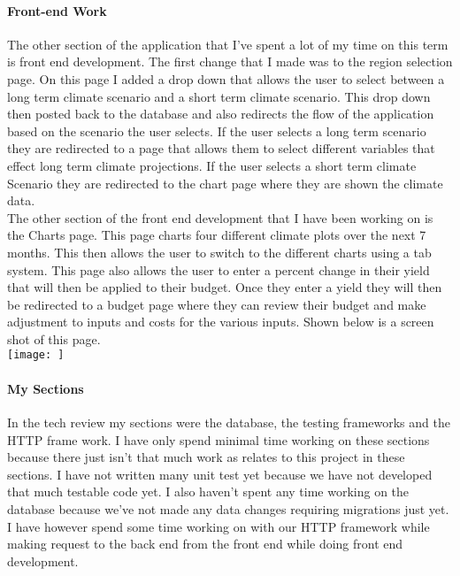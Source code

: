 \documentclass[onecolumn, draftclsnofoot,10pt, compsoc]{article}
\begin{document}
		\paragraph{Front-end Work} \hfill \break
		The other section of the application that I've spent a lot of my time on this term is front end development. The first change that I made was to the region selection page. On this page I added a drop down that allows the user to select between a long term climate scenario and a short term climate scenario. This drop down then posted back to the database and also redirects the flow of the application based on the scenario the user selects. If the user selects a long term scenario they are redirected to a page that allows them to select different variables that effect long term climate projections. If the user selects a short term climate Scenario they are redirected to the chart page where they are shown the climate data.\\
		
		The other section of the front end development that I have been working on is the Charts page. This page charts four different climate plots over the next 7 months. This then allows the user to switch to the different charts using a tab system. This page also allows the user to enter a percent change in their yield that will then be applied to their budget. Once they enter a yield they will then be redirected to a budget page where they can review their budget and make adjustment to inputs and costs for the various inputs. Shown below is a screen shot of this page.\\
		
		\texttt{[image: ]}

 		\paragraph{My Sections} \hfill \break
		In the tech review my sections were the database, the testing frameworks and the HTTP frame work. I have only spend minimal time working on these sections because there just isn't that much work as relates to this project in these sections. I have not written many unit test yet because we have not developed that much testable code yet. I also haven’t spent any time working on the database because we've not made any data changes requiring migrations just yet. I have however spend some time working on with our HTTP framework while making request to the back end from the front end while doing front end development.\\
\end{document}
